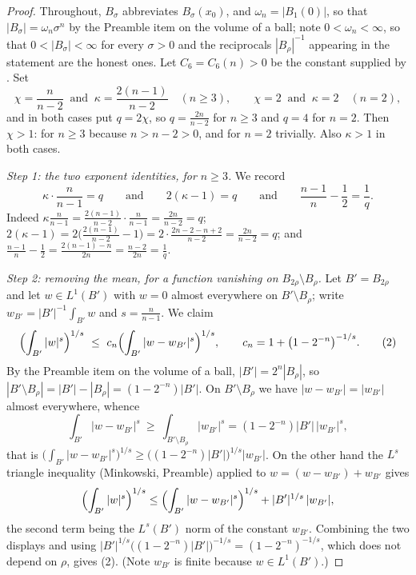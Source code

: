 \begin{proof}
Throughout, $B_\sigma$ abbreviates $B_\sigma(x_0)$, and $\omega_n=|B_1(0)|$, so
that $|B_\sigma|=\omega_n\sigma^n$ by the Preamble item on the volume of a ball;
note $0<\omega_n<\infty$, so that $0<|B_\sigma|<\infty$ for every $\sigma>0$ and
the reciprocals $|B_\rho|^{-1}$ appearing in the statement are the honest ones.
Let $C_6=C_6(n)>0$ be the constant supplied by
.  Set
\[
\chi=\frac n{n-2}\ \text{ and }\ \kappa=\frac{2(n-1)}{n-2}\quad(n\ge3),
\qquad
\chi=2\ \text{ and }\ \kappa=2\quad(n=2),
\]
and in both cases put $q=2\chi$, so $q=\frac{2n}{n-2}$ for $n\ge3$ and $q=4$
for $n=2$.  Then $\chi>1$: for $n\ge3$ because $n>n-2>0$, and for $n=2$
trivially.  Also $\kappa>1$ in both cases.

\emph{Step 1: the two exponent identities, for $n\ge3$.}  We record
\[
\kappa\cdot\frac n{n-1}=q
\qquad\text{and}\qquad
2(\kappa-1)=q
\qquad\text{and}\qquad
\frac{n-1}n-\frac12=\frac1q .
\tag{1}
\]
Indeed $\kappa\frac n{n-1}=\frac{2(n-1)}{n-2}\cdot\frac n{n-1}=\frac{2n}{n-2}=q$;
$2(\kappa-1)=2\bigl(\frac{2(n-1)}{n-2}-1\bigr)
=2\cdot\frac{2n-2-n+2}{n-2}=\frac{2n}{n-2}=q$; and
$\frac{n-1}n-\frac12=\frac{2(n-1)-n}{2n}=\frac{n-2}{2n}=\frac1q$.

\emph{Step 2: removing the mean, for a function vanishing on
$B_{2\rho}\setminus B_\rho$.}  Let $B'=B_{2\rho}$ and let $w\in L^1(B')$ with
$w=0$ almost everywhere on $B'\setminus B_\rho$; write
$w_{B'}=|B'|^{-1}\int_{B'}w$ and $s=\frac n{n-1}$.  We claim
\[
\Bigl(\int_{B'}|w|^{s}\Bigr)^{1/s}
\ \le\ c_n\Bigl(\int_{B'}|w-w_{B'}|^{s}\Bigr)^{1/s},
\qquad c_n=1+\bigl(1-2^{-n}\bigr)^{-1/s} .
\tag{2}
\]
By the Preamble item on the volume of a ball, $|B'|=2^n|B_\rho|$, so
$|B'\setminus B_\rho|=|B'|-|B_\rho|=(1-2^{-n})|B'|$.  On $B'\setminus B_\rho$ we
have $|w-w_{B'}|=|w_{B'}|$ almost everywhere, whence
\[
\int_{B'}|w-w_{B'}|^{s}
\ \ge\ \int_{B'\setminus B_\rho}|w_{B'}|^{s}
=(1-2^{-n})|B'|\,|w_{B'}|^{s},
\]
that is $\bigl(\int_{B'}|w-w_{B'}|^{s}\bigr)^{1/s}\ge
\bigl((1-2^{-n})|B'|\bigr)^{1/s}|w_{B'}|$.  On the other hand the $L^{s}$
triangle inequality (Minkowski, Preamble) applied to
$w=(w-w_{B'})+w_{B'}$ gives
\[
\Bigl(\int_{B'}|w|^{s}\Bigr)^{1/s}
\le\Bigl(\int_{B'}|w-w_{B'}|^{s}\Bigr)^{1/s}+|B'|^{1/s}\,|w_{B'}| ,
\]
the second term being the $L^{s}(B')$ norm of the constant $w_{B'}$.  Combining
the two displays and using
$|B'|^{1/s}\bigl((1-2^{-n})|B'|\bigr)^{-1/s}=(1-2^{-n})^{-1/s}$, which does not
depend on $\rho$, gives (2).  (Note $w_{B'}$ is finite because $w\in L^1(B')$.)


\end{proof}
